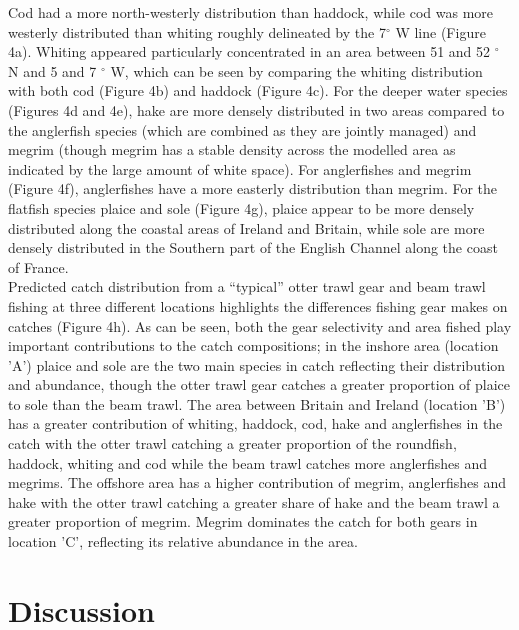 \documentclass[fleqn,10pt]{wlscirep}
\begin{document}
\begin{linenumbers}
Cod had a more north-westerly distribution than haddock, while cod was more
westerly distributed than whiting roughly delineated by the 7$^{\circ}$ W line
(Figure 4a). Whiting appeared particularly concentrated in an area between 51
and 52 $^{\circ}$ N and 5 and 7 $^{\circ}$ W, which can be seen by comparing
the whiting distribution with both cod (Figure 4b) and haddock (Figure 4c). For
the deeper water species (Figures 4d and 4e), hake are more densely distributed
in two areas compared to the anglerfish species (which are combined as they are
jointly managed) and megrim (though megrim has a stable density across the
modelled area as indicated by the large amount of white space). For
anglerfishes and megrim (Figure 4f), anglerfishes have a more easterly
distribution than megrim. For the flatfish species plaice and sole (Figure 4g),
plaice appear to be more densely distributed along the coastal areas of Ireland
and Britain, while sole are more densely distributed in the Southern part of
the English Channel along the coast of France.\\

Predicted catch distribution from a ``typical'' otter trawl gear and beam trawl
fishing at three different locations highlights the differences fishing gear
makes on catches (Figure 4h). As can be seen, both the gear selectivity and
area fished play important contributions to the catch compositions; in the
inshore area (location 'A') plaice and sole are the two main species in catch
reflecting their distribution and abundance, though the otter trawl gear
catches a greater proportion of plaice to sole than the beam trawl.  The area
between Britain and Ireland (location 'B') has a greater contribution of
whiting, haddock, cod, hake and anglerfishes in the catch with the otter trawl
catching a greater proportion of the roundfish, haddock, whiting and cod while
the beam trawl catches more anglerfishes and megrims. The offshore area has a
higher contribution of megrim, anglerfishes and hake with the otter trawl
catching a greater share of hake and the beam trawl a greater proportion of
megrim. Megrim dominates the catch for both gears in location 'C', reflecting
its relative abundance in the area.  \\

\section*{Discussion\\}


\end{linenumbers}
\end{document}
